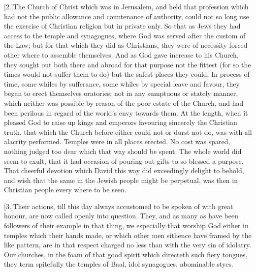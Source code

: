 [2.]The Church of Christ which was in Jerusalem, and held that profession which had not the public allowance and countenance of authority, could not so long use the exercise of Christian religion but in private only. So that as Jews they had access to the temple and synagogues, where God was served after the custom of the Law; but for that which they did as Christians, they were of necessity forced other where to assemble themselves. And as God gave increase to his Church, they sought out both there and abroad for that purpose not the fittest (for so the times would not suffer them to do) but the safest places they could. In process of time, some whiles by sufferance, some whiles by special leave and favour, they began to erect themselves oratories; not in any sumptuous or stately manner, which neither was possible by reason of the poor estate of the Church, and had been perilous in regard of the world’s envy towards them. At the length, when it pleased God to raise up kings and emperors favouring sincerely the Christian truth, that which the Church before either could not or durst not do, was with all alacrity performed. Temples were in all places erected. No cost was spared, nothing judged too dear which that way should be spent. The whole world did seem to exult, that it had occasion of pouring out gifts to so blessed a purpose. That cheerful devotion which David this way did exceedingly delight to behold, and wish that the same in the Jewish people might be perpetual, was then in Christian people every where to be seen.

[3.]Their actions, till this day always accustomed to be spoken of with great honour, are now called openly into question. They, and as many as have been followers of their example in that thing, we especially that worship God either in temples which their hands made, or which other men  sithence have framed by the like pattern, are in that respect charged no less than with the very sin of idolatry.
 Our churches, in the foam of that good spirit which directeth such fiery tongues, they term spitefully the temples of Baal, idol synagogues, abominable styes.


